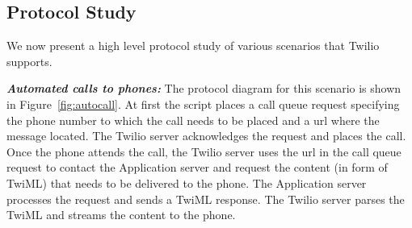 \subsection{Protocol Study}

We now present a high level protocol study of various scenarios that Twilio supports. 

\emph{\textbf{Automated calls to phones:} }
The protocol diagram for this scenario is shown in  Figure~\ref{fig:autocall}. At first the script places a call queue request specifying the phone number to which the call needs to be placed and a url where the message located. The Twilio server acknowledges the request and places the call. Once the phone attends the call, the Twilio server uses the url in the call queue request to contact the Application server and request the content (in form of TwiML) that needs to be delivered to the phone. The Application server processes the request and sends a TwiML response. The Twilio server parses the TwiML and streams the content to the phone.  


